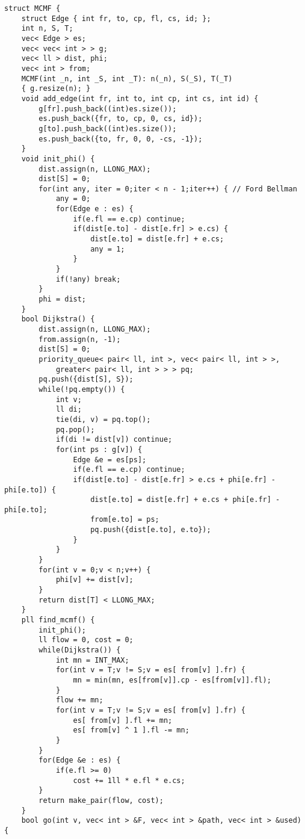 \documentclass[12pt]{article}
\begin{document}
\begin{verbatim}
struct MCMF {
    struct Edge { int fr, to, cp, fl, cs, id; };
    int n, S, T;
    vec< Edge > es;
    vec< vec< int > > g;
    vec< ll > dist, phi;
    vec< int > from;
    MCMF(int _n, int _S, int _T): n(_n), S(_S), T(_T)
    { g.resize(n); }
    void add_edge(int fr, int to, int cp, int cs, int id) {
        g[fr].push_back((int)es.size());
        es.push_back({fr, to, cp, 0, cs, id});
        g[to].push_back((int)es.size());
        es.push_back({to, fr, 0, 0, -cs, -1});
    }
    void init_phi() {
        dist.assign(n, LLONG_MAX);
        dist[S] = 0;
        for(int any, iter = 0;iter < n - 1;iter++) { // Ford Bellman
            any = 0;
            for(Edge e : es) {
                if(e.fl == e.cp) continue;
                if(dist[e.to] - dist[e.fr] > e.cs) {
                    dist[e.to] = dist[e.fr] + e.cs;
                    any = 1;
                }
            }
            if(!any) break;
        }
        phi = dist;
    }
    bool Dijkstra() {
        dist.assign(n, LLONG_MAX);
        from.assign(n, -1);
        dist[S] = 0;
        priority_queue< pair< ll, int >, vec< pair< ll, int > >, 
            greater< pair< ll, int > > > pq;
        pq.push({dist[S], S});
        while(!pq.empty()) {
            int v;
            ll di;
            tie(di, v) = pq.top();
            pq.pop();
            if(di != dist[v]) continue;
            for(int ps : g[v]) {
                Edge &e = es[ps];
                if(e.fl == e.cp) continue;
                if(dist[e.to] - dist[e.fr] > e.cs + phi[e.fr] - phi[e.to]) {
                    dist[e.to] = dist[e.fr] + e.cs + phi[e.fr] - phi[e.to];
                    from[e.to] = ps;
                    pq.push({dist[e.to], e.to});
                }
            }
        }
        for(int v = 0;v < n;v++) {
            phi[v] += dist[v];
        }
        return dist[T] < LLONG_MAX;
    }
    pll find_mcmf() {
        init_phi();
        ll flow = 0, cost = 0;
        while(Dijkstra()) {
            int mn = INT_MAX;
            for(int v = T;v != S;v = es[ from[v] ].fr) {
                mn = min(mn, es[from[v]].cp - es[from[v]].fl);
            }
            flow += mn;
            for(int v = T;v != S;v = es[ from[v] ].fr) {
                es[ from[v] ].fl += mn;
                es[ from[v] ^ 1 ].fl -= mn;
            }
        }
        for(Edge &e : es) {
            if(e.fl >= 0)
                cost += 1ll * e.fl * e.cs;
        }
        return make_pair(flow, cost);
    }
    bool go(int v, vec< int > &F, vec< int > &path, vec< int > &used) {

\end{verbatim}
\end{document}
